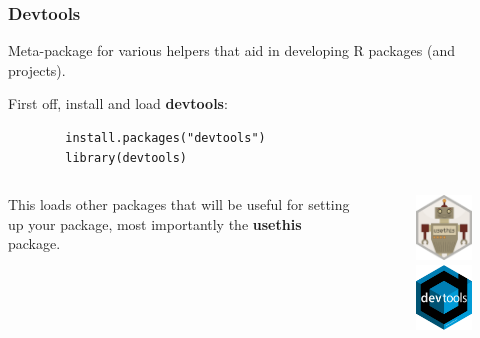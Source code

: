 \documentclass[aspectratio=1610,onlytextwidth]{beamer}
\begin{document}
\begin{frame}[c,fragile]
  \frametitle{Devtools}

  Meta-package for various helpers that
  aid in developing R packages (and projects).

  First off, install and load \textbf{devtools}:
  \begin{lstlisting}
        install.packages("devtools")
        library(devtools)
      \end{lstlisting}

  \begin{columns}
    \begin{column}{0.45\textwidth}

      This loads other packages that will be useful
      for setting up your package, most importantly the \textbf{usethis}
      package.
    \end{column}
    \begin{column}{0.45\textwidth}
      \begin{figure}[htpb]
        \centering
        \includegraphics[width=2.5cm]{images/usethis-logo.png}%
        \includegraphics[width=2.5cm]{images/devtools.pdf}
      \end{figure}
    \end{column}
  \end{columns}
\end{frame}
\end{document}
